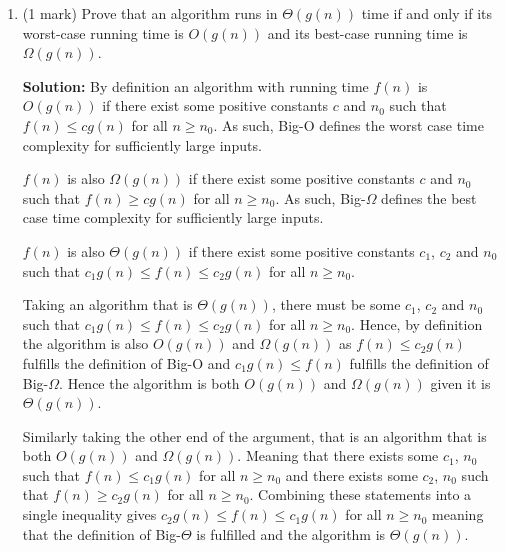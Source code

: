 \documentclass[a4,13pt]{extarticle}
\newenvironment{Solution}{\color{blue}\textbf{Solution:}}{}
\begin{document}
\begin{enumerate}
\begin{enumerate}
			\begin{Solution}
				
				While this can be true in some cases, it can not be generalised. This is because the Big-O of an algorithm is the the tightest bound of the algorithm from above, and thus the worst case, while Big-$\Omega$ is the tightest bound from below and thus the best case. If the best and worst case runtime of the algorithm are both equal, then the classmate's statement is correct.
			\end{Solution}
			  
			\medskip
	      	      	      	                  
	      	\item (1 mark) Prove that an algorithm runs in $\Theta (g(n))$ time if and only if its worst-case running time is $O(g(n))$ and its best-case running time is $\Omega(g(n))$.
	      	      
			\begin{Solution}
				By definition an algorithm with running time $f(n)$ is $O(g(n))$ if there exist some positive constants $c$ and $n_0$ such that $f(n) \leq cg(n)$ for all $n \geq n_0$. As such, Big-O defines the worst case time complexity for sufficiently large inputs.
				
				$f(n)$ is also $\Omega(g(n))$ if there exist some positive constants $c$ and $n_0$ such that $f(n) \geq cg(n)$ for all $n \geq n_0$. As such, Big-$\Omega$ defines the best case time complexity for sufficiently large inputs.

				$f(n)$ is also $\Theta(g(n))$ if there exist some positive constants $c_1$, $c_2$ and $n_0$ such that $c_1g(n) \leq f(n)\leq c_2g(n)$ for all $n \geq n_0$.

				Taking an algorithm that is $\Theta(g(n))$, there must be some $c_1$, $c_2$ and $n_0$ such that $c_1g(n) \leq f(n) \leq c_2g(n)$ for all $n \geq n_0$. Hence, by definition the algorithm is also $O(g(n))$ and $\Omega(g(n))$ as $f(n) \leq c_2g(n)$ fulfills the definition of Big-O and $c_1g(n) \leq f(n)$ fulfills the definition of Big-$\Omega$. Hence the algorithm is both $O(g(n))$ and $\Omega(g(n))$ given it is $\Theta(g(n))$.

				Similarly taking the other end of the argument, that is an algorithm that is both $O(g(n))$ and $\Omega(g(n))$. Meaning that there exists some $c_1$, $n_0$ such that $f(n) \leq c_1g(n)$ for all $n \geq n_0$ and there exists some $c_2$, $n_0$ such that $f(n) \geq c_2g(n)$ for all $n \geq n_0$. Combining these statements into a single inequality gives $c_2g(n) \leq f(n) \leq c_1g(n)$ for all $n \geq n_0$ meaning that the definition of Big-$\Theta$ is fulfilled and the algorithm is $\Theta(g(n))$.


\end{Solution}
\end{enumerate}
\end{enumerate}
\end{document}
